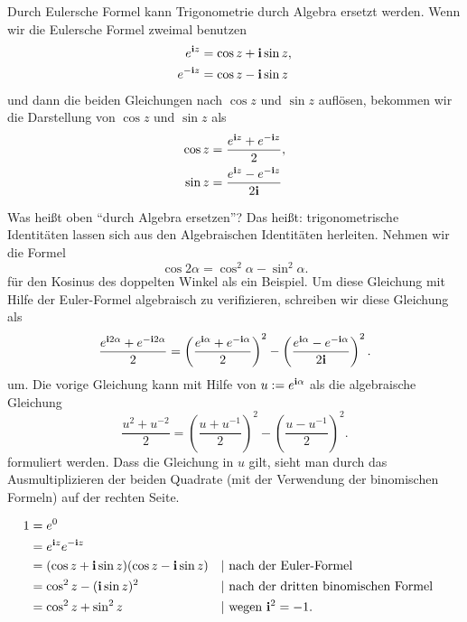 \begin{bem} 
	Durch Eulersche Formel kann Trigonometrie durch Algebra ersetzt werden. 
	Wenn wir die Eulersche Formel zweimal benutzen
	\begin{align*}
		e^{\mathbf{i} z} & = \cos z + \mathbf{i} \sin z,
		\\ e^{-\mathbf{i} z} & = \cos z - \mathbf{i} \sin z 
	\end{align*}
	und dann die beiden Gleichungen nach $\cos z$ und $\sin z$ auflösen,  bekommen wir die Darstellung von $\cos z$ und $\sin z$ als 
	\begin{align*}
		\cos z & = \frac{ e^{\mathbf{i} z} + e^{-\mathbf{i} z}}{2},
	\\	\sin z & = \frac{ e^{\mathbf{i} z} - e^{-\mathbf{i} z}}{2 \mathbf{i}}
	\end{align*}
\end{bem} 

\begin{bsp}
	Was heißt oben ``durch Algebra ersetzen''? Das heißt: trigonometrische Identitäten lassen sich aus den Algebraischen Identitäten herleiten. Nehmen wir die Formel 
	 \[
	 	\cos  2 \alpha  = \cos^2 \alpha - \sin^2 \alpha. 
	 \]
	 für den Kosinus des doppelten Winkel als ein Beispiel. Um diese Gleichung mit Hilfe der Euler-Formel algebraisch zu verifizieren, schreiben wir diese Gleichung als
	 \[
	 	 \frac{e^{\mathbf{i} 2 \alpha} + e^{-\mathbf{i} 2 \alpha}}{2} = \left( \frac{ e^{\mathbf{i} \alpha}  + e^{-\mathbf{i} \alpha}}{2} \right)^2 - \left( \frac{ e^{\mathbf{i} \alpha}  -  e^{-\mathbf{i} \alpha}}{2 \mathbf{i}} \right)^2.
	 \]
	 um.  Die vorige Gleichung  kann mit Hilfe von $u := e^{\mathbf{i} \alpha}$ als die algebraische Gleichung 
	 \[
	 	\frac{u^2 + u^{-2}}{2} = \left( \frac{u+ u^{-1}}{2}\right)^2 - \left( \frac{u -  u^{-1}}{2}\right)^2.
	 \]
	 formuliert werden. Dass die Gleichung in $u$ gilt, sieht man durch das Ausmultiplizieren der beiden Quadrate (mit der Verwendung der binomischen Formeln) auf der rechten Seite. 
\end{bsp} 

\begin{bsp}
	\begin{align*}
		1 & = e^0
		\\ & = e^{\iu z} e^{-\iu z} 
		\\ & = (\cos z + \iu \sin z) (\cos z - \iu \sin z) & &| \text{ nach der Euler-Formel}
		\\ & = \cos^2 z - (\iu \sin z)^2 & &| \text{ nach der dritten binomischen Formel}
		\\ & = \cos^2 z + \sin^2 z & &| \text{ wegen} \ \iu^2 = -1. 
	\end{align*}
\end{bsp} 

